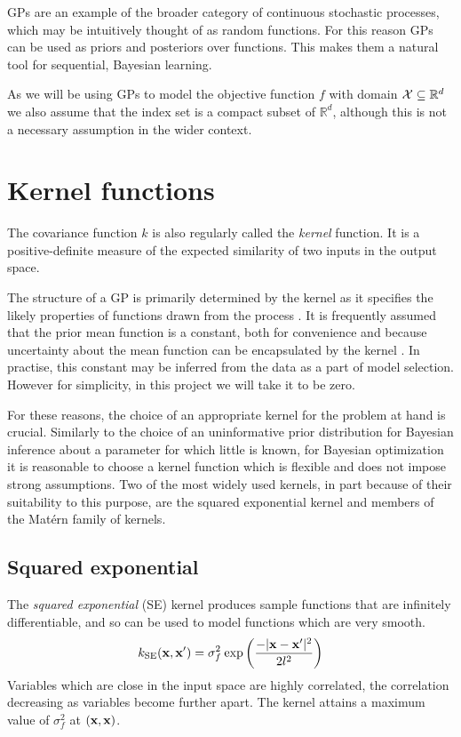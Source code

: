GPs are an example of the broader category of continuous stochastic processes, which may be intuitively thought of as random functions. For this reason GPs can be used as priors and posteriors over functions. This makes them a natural tool for sequential, Bayesian learning.

As we will be using GPs to model the objective function $f$ with domain $\mathcal{X} \subseteq \mathbb{R}^d$ we also assume that the index set is a compact subset of $\mathbb{R}^d$, although this is not a necessary assumption in the wider context.

\section{Kernel functions}

The covariance function $k$ is also regularly called the \textit{kernel} function. It is a positive-definite measure of the expected similarity of two inputs in the output space. 

The structure of a GP is primarily determined by the kernel as it specifies the likely properties of functions drawn from the process \cite{snelson2008flexible}. It is frequently assumed that the prior mean function is a constant, both for convenience and because uncertainty about the mean function can be encapsulated by the kernel \cite{duvenaud2014automatic}. In practise, this constant may be inferred from the data \cite{lizotte} as a part of model selection. However for simplicity, in this project we will take it to be zero. 

For these reasons, the choice of an appropriate kernel for the problem at hand is crucial. Similarly to the choice of an uninformative prior distribution for Bayesian inference about a parameter for which little is known, for Bayesian optimization it is reasonable to choose a kernel function which is flexible and does not impose strong assumptions. Two of the most widely used kernels, in part because of their suitability to this purpose, are the squared exponential kernel and members of the Matérn family of kernels.

\subsection{Squared exponential} \label{sec:sekernel}

The \textit{squared exponential} (SE) kernel produces sample functions that are infinitely differentiable, and so can be used to model functions which are very smooth.
%
\begin{equation}
k_{\mathrm{SE}}(\mathbf{x}, \mathbf{x}') = \sigma_f^2\:\mathrm{exp}\left(\frac{- \lvert \mathbf{x} - \mathbf{x}' \rvert ^2}{2l^2}\right)
\end{equation}
%
Variables which are close in the input space are highly correlated, the correlation decreasing as variables become further apart. The kernel attains a maximum value of $\sigma_f^2$ at $(\mathbf{x}, \mathbf{x})$. 

